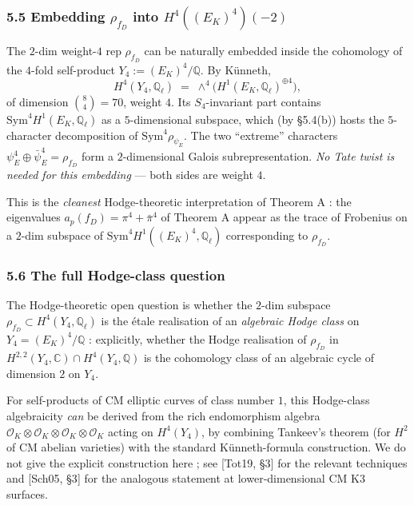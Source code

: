 \documentclass[
  11pt,
  a4paper,
]{amsart}
\begin{document}
\hypertarget{embedding-rho_f_d-into-h4e_k4-2}{%
\subsubsection{\texorpdfstring{5.5 Embedding \(\rho_{f_D}\) into \(H^4((E_K)^4)(-2)\)}{5.5 Embedding \textbackslash rho\_\{f\_D\} into H\^{}4((E\_K)\^{}4)(-2)}}\label{embedding-rho_f_d-into-h4e_k4-2}}

The \(2\)-dim weight-\(4\) rep \(\rho_{f_D}\) can be naturally embedded inside the cohomology of the \(4\)-fold self-product \(Y_4 := (E_K)^4 / \mathbb{Q}\). By Künneth,
\[
H^4(Y_4, \mathbb{Q}_\ell) \;=\; \wedge^4 \bigl(H^1(E_K, \mathbb{Q}_\ell)^{\oplus 4}\bigr),
\]
of dimension \(\binom{8}{4} = 70\), weight \(4\). Its \(S_4\)-invariant part contains \(\mathrm{Sym}^4 H^1(E_K, \mathbb{Q}_\ell)\) as a \(5\)-dimensional subspace, which (by §5.4(b)) hosts the \(5\)-character decomposition of \(\mathrm{Sym}^4 \rho_{\psi_E}\). The two ``extreme'' characters \(\psi_E^4 \oplus \bar\psi_E^4 = \rho_{f_D}\) form a \(2\)-dimensional Galois subrepresentation. \emph{No Tate twist is needed for this embedding} --- both sides are weight \(4\).

This is the \emph{cleanest} Hodge-theoretic interpretation of Theorem A : the eigenvalues \(a_p(f_D) = \pi^4 + \bar\pi^4\) of Theorem A appear as the trace of Frobenius on a \(2\)-dim subspace of \(\mathrm{Sym}^4 H^1((E_K)^4, \mathbb{Q}_\ell)\) corresponding to \(\rho_{f_D}\).

\hypertarget{the-full-hodge-class-question}{%
\subsubsection{5.6 The full Hodge-class question}\label{the-full-hodge-class-question}}

The Hodge-theoretic open question is whether the \(2\)-dim subspace \(\rho_{f_D} \subset H^4(Y_4, \mathbb{Q}_\ell)\) is the étale realisation of an \emph{algebraic Hodge class} on \(Y_4 = (E_K)^4 / \mathbb{Q}\) : explicitly, whether the Hodge realisation of \(\rho_{f_D}\) in \(H^{2, 2}(Y_4, \mathbb{C}) \cap H^4(Y_4, \mathbb{Q})\) is the cohomology class of an algebraic cycle of dimension \(2\) on \(Y_4\).

For self-products of CM elliptic curves of class number \(1\), this Hodge-class algebraicity \emph{can} be derived from the rich endomorphism algebra \(\mathcal{O}_K \otimes \mathcal{O}_K \otimes \mathcal{O}_K \otimes \mathcal{O}_K\) acting on \(H^4(Y_4)\), by combining Tankeev's theorem (for \(H^2\) of CM abelian varieties) with the standard Künneth-formula construction. We do not give the explicit construction here ; see {[}Tot19, §3{]} for the relevant techniques and {[}Sch05, §3{]} for the analogous statement at lower-dimensional CM K3 surfaces.
\end{document}
